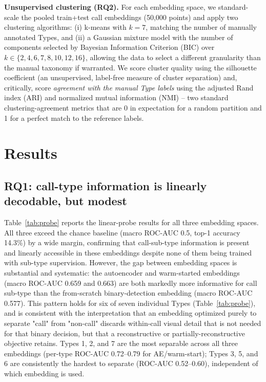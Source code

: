 \documentclass{article}
\begin{document}
\textbf{Unsupervised clustering (RQ2).} For each embedding space, we
standard-scale the pooled train+test call embeddings (50{,}000 points) and
apply two clustering algorithms: (i) k-means with $k=7$, matching the
number of manually annotated Types, and (ii) a Gaussian mixture model
with the number of components selected by Bayesian Information Criterion
(BIC) over $k \in \{2,4,6,7,8,10,12,16\}$, allowing the data to select a
different granularity than the manual taxonomy if warranted. We score
cluster quality using the silhouette coefficient (an unsupervised,
label-free measure of cluster separation) and, critically, score
\emph{agreement with the manual Type labels} using the adjusted Rand
index (ARI) and normalized mutual information (NMI) -- two standard
clustering-agreement metrics that are 0 in expectation for a random
partition and 1 for a perfect match to the reference labels.

\section{Results}
\label{sec:results}

\subsection{RQ1: call-type information is linearly decodable, but modest}

Table~\ref{tab:probe} reports the linear-probe results for all three
embedding spaces. All three exceed the chance baseline (macro ROC-AUC
0.5, top-1 accuracy 14.3\%) by a wide margin, confirming that
call-sub-type information is present and linearly accessible in these
embeddings despite none of them being trained with sub-type supervision.
However, the gap between embedding spaces is substantial and
systematic: the autoencoder and warm-started embeddings (macro ROC-AUC
0.659 and 0.663) are both markedly more informative for call sub-type
than the from-scratch binary-detection embedding (macro ROC-AUC 0.577).
This pattern holds for six of seven individual Types
(Table~\ref{tab:probe}), and is consistent with the interpretation that
an embedding optimized purely to separate "call" from "non-call" discards
within-call visual detail that is not needed for that binary decision, but
that a reconstructive or partially-reconstructive objective retains.
Types 1, 2, and 7 are the most separable across all three embeddings
(per-type ROC-AUC 0.72--0.79 for AE/warm-start); Types 3, 5, and 6 are
consistently the hardest to separate (ROC-AUC 0.52--0.60), independent of
which embedding is used.
\end{document}
